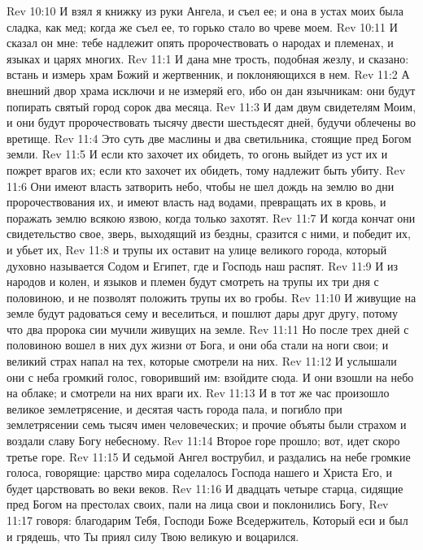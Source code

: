 \vs Rev 10:10 И взял я книжку из руки Ангела, и съел ее; и она в устах моих была сладка, как мед; когда же съел ее, то горько стало во чреве моем.
\vs Rev 10:11 И сказал он мне: тебе надлежит опять пророчествовать о народах и племенах, и языках и царях многих.
\vs Rev 11:1 И дана мне трость, подобная жезлу, и сказано: встань и измерь храм Божий и жертвенник, и поклоняющихся в нем.
\vs Rev 11:2 А внешний двор храма исключи и не измеряй его, ибо он дан язычникам: они будут попирать святый город сорок два месяца.
\vs Rev 11:3 И дам двум свидетелям Моим, и они будут пророчествовать тысячу двести шестьдесят дней, будучи облечены во вретище.
\vs Rev 11:4 Это суть две маслины и два светильника, стоящие пред Богом земли.
\vs Rev 11:5 И если кто захочет их обидеть, то огонь выйдет из уст их и пожрет врагов их; если кто захочет их обидеть, тому надлежит быть убиту.
\vs Rev 11:6 Они имеют власть затворить небо, чтобы не шел дождь на землю во дни пророчествования их, и имеют власть над водами, превращать их в кровь, и поражать землю всякою язвою, когда только захотят.
\vs Rev 11:7 И когда кончат они свидетельство свое, зверь, выходящий из бездны, сразится с ними, и победит их, и убьет их,
\vs Rev 11:8 и трупы их оставит на улице великого города, который духовно называется Содом и Египет, где и Господь наш распят.
\vs Rev 11:9 И  из народов и колен, и языков и племен будут смотреть на трупы их три дня с половиною, и не позволят положить трупы их во гробы.
\vs Rev 11:10 И живущие на земле будут радоваться сему и веселиться, и пошлют дары друг другу, потому что два пророка сии мучили живущих на земле.
\vs Rev 11:11 Но после трех дней с половиною вошел в них дух жизни от Бога, и они оба стали на ноги свои; и великий страх напал на тех, которые смотрели на них.
\vs Rev 11:12 И услышали они с неба громкий голос, говоривший им: взойдите сюда. И они взошли на небо на облаке; и смотрели на них враги их.
\vs Rev 11:13 И в тот же час произошло великое землетрясение, и десятая часть города пала, и погибло при землетрясении семь тысяч имен человеческих; и прочие объяты были страхом и воздали славу Богу небесному.
\rsbpar\vs Rev 11:14 Второе горе прошло; вот, идет скоро третье горе.
\rsbpar\vs Rev 11:15 И седьмой Ангел вострубил, и раздались на небе громкие голоса, говорящие: царство мира соделалось  Господа нашего и Христа Его, и будет царствовать во веки веков.
\vs Rev 11:16 И двадцать четыре старца, сидящие пред Богом на престолах своих, пали на лица свои и поклонились Богу,
\vs Rev 11:17 говоря: благодарим Тебя, Господи Боже Вседержитель, Который еси и был и грядешь, что Ты приял силу Твою великую и воцарился.
